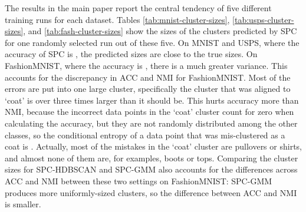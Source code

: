 \documentclass[runningheads]{llncs}
\begin{document}
The results in the main paper report the central tendency of five different training runs for each dataset. Tables \ref{tab:mnist-cluster-sizes}, \ref{tab:usps-cluster-sizes}, and \ref{tab:fash-cluster-sizes} show the sizes of the clusters predicted by SPC for one randomly selected run out of these five. On MNIST and USPS, where the accuracy of SPC is , the predicted sizes are close to the true sizes. On FashionMNIST, where the accuracy is , there is a much greater variance. This accounts for the discrepancy in ACC and NMI for FashionMNIST. Most of the errors are put into one large cluster, specifically the cluster that was aligned to `coat' is over three times larger than it should be. This hurts accuracy more than NMI, because the incorrect data points in the `coat' cluster count for zero when calculating the accuracy, but they are not randomly distributed among the other classes, so the conditional entropy of a data point that was mis-clustered as a coat is . Actually, most of the mistakes in the `coat' cluster are pullovers or shirts, and almost none of them are, for examples, boots or tops. Comparing the cluster sizes for SPC-HDBSCAN and SPC-GMM also accounts for the differences across ACC and NMI between these two settings on FashionMNIST: SPC-GMM produces more uniformly-sized clusters, so the difference between ACC and NMI is smaller.  
\end{document}
